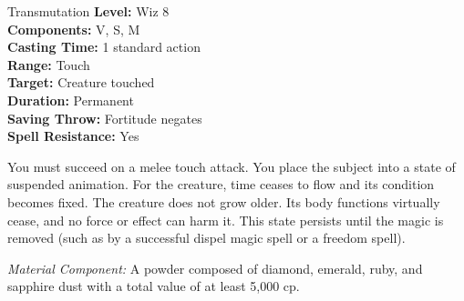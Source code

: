{Transmutation}
{
	\textbf{Level:}
	Wiz 8\\
	\textbf{Components:}
	V, S, M\\
	\textbf{Casting Time:}
	1 standard action\\
	\textbf{Range:}
	Touch\\
	\textbf{Target:}
	Creature touched\\
	\textbf{Duration:}
	Permanent\\
	\textbf{Saving Throw:}
	Fortitude negates\\
	\textbf{Spell Resistance:}
	Yes\\
}
{
	You must succeed on a melee touch attack. You place the subject into a state of suspended animation. For the creature, time ceases to flow and its condition becomes fixed. The creature does not grow older. Its body functions virtually cease, and no force or effect can harm it. This state persists until the magic is removed (such as by a successful dispel magic spell or a freedom spell).

	\textit{Material Component:}
	A powder composed of diamond, emerald, ruby, and sapphire dust with a total value of at least 5,000 cp.

}
